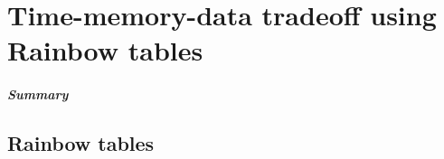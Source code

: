 \chapter{Time-memory-data tradeoff using Rainbow tables}
\label{chapter:tmdto-rainbow}

\paragraph{Summary}


\section{Rainbow tables}
